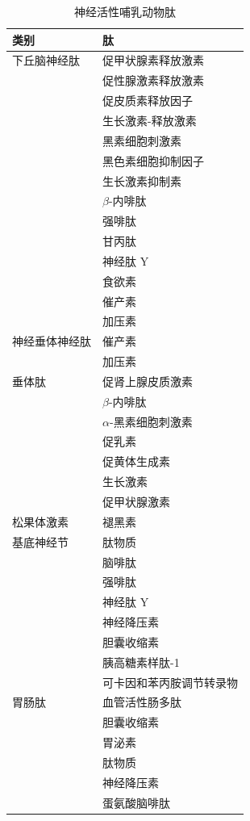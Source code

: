 \begin{table}[htbp]
	\caption{神经活性哺乳动物肽} \label{tab:16_2} \centering
	\begin{tabular}{ll}
		\toprule
		类别 & 肽 \\
		\midrule
		下丘脑神经肽 & 促甲状腺素释放激素  \\
		 & 促性腺激素释放激素  \\
		 & 促皮质素释放因子  \\
		 & 生长激素-释放激素  \\
		 & 黑素细胞刺激素  \\
		 & 黑色素细胞抑制因子  \\
		 & 生长激素抑制素  \\
		 & $\beta$-内啡肽  \\
		 & 强啡肽  \\
		 & 甘丙肽  \\
		 & 神经肽 Y  \\
		 & 食欲素   \\
		 & 催产素   \\
		 & 加压素   \\
		神经垂体神经肽 & 催产素   \\
		 & 加压素   \\
		垂体肽 & 促肾上腺皮质激素   \\
		 & $\beta$-内啡肽   \\
		 & $\alpha$-黑素细胞刺激素   \\
		 & 促乳素   \\
		 & 促黄体生成素   \\
		 & 生长激素   \\
		 & 促甲状腺激素   \\
		松果体激素 & 褪黑素   \\
		基底神经节 & 肽物质   \\
		 & 脑啡肽   \\
		 & 强啡肽   \\
		 & 神经肽 Y   \\
		 & 神经降压素   \\
		 & 胆囊收缩素   \\
		 & 胰高糖素样肽-1   \\
		 & 可卡因和苯丙胺调节转录物   \\
		胃肠肽 & 血管活性肠多肽   \\
		 & 胆囊收缩素   \\
		 & 胃泌素   \\
		 & 肽物质   \\
		 & 神经降压素   \\
		 & 蛋氨酸脑啡肽   \\

\end{tabular}
\end{table}
